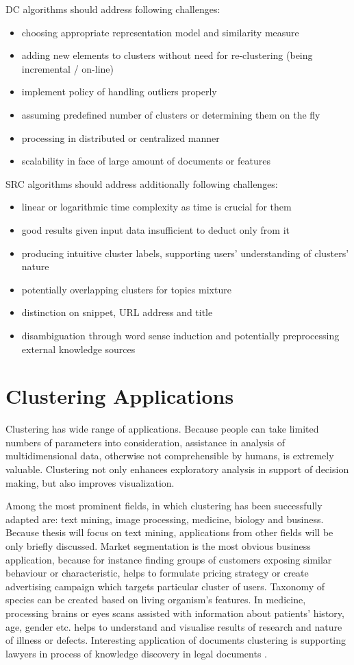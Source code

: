 \documentclass[a4paper, 12pt, oneside]{Thesis} %
\begin{document}
DC algorithms should address following challenges:
\begin{itemize}
\item choosing appropriate representation model and similarity measure
\item adding new elements to clusters without need for re-clustering (being incremental / on-line)
\item implement policy of handling outliers properly
\item assuming predefined number of clusters or determining them on the fly
\item processing in distributed or centralized manner
\item scalability in face of large amount of documents or features
\end{itemize}

SRC algorithms should address additionally following challenges:
\begin{itemize}
    \item linear or logarithmic time complexity as time is crucial for them
    \item good results given input data insufficient to deduct only from it
    \item producing intuitive cluster labels, supporting users' understanding of clusters' nature
    \item potentially overlapping clusters for topics mixture
    \item distinction on snippet, URL address and title
    \item disambiguation through word sense induction and potentially preprocessing external knowledge sources
\end{itemize}

\section{Clustering Applications} Clustering has wide range of applications. Because people can take limited numbers of parameters into consideration, assistance in analysis of multidimensional data, otherwise not comprehensible by humans, is extremely valuable. Clustering not only enhances exploratory analysis in support of decision making, but also improves visualization.

Among the most prominent fields, in which clustering has been successfully adapted are: text mining, image processing, medicine, biology and business. Because thesis will focus on text mining, applications from other fields will be only briefly discussed. Market segmentation is the most obvious business application, because for instance finding groups of customers exposing similar behaviour or characteristic, helps to formulate pricing strategy or create advertising campaign which targets particular cluster of users. Taxonomy of species can be created based on living organism's features. In medicine, processing brains or eyes scans assisted with information about patients' history, age, gender etc. helps to understand and visualise results of research and nature of illness or defects. Interesting application of documents clustering is supporting lawyers in process of knowledge discovery in legal documents \cite{kozlowski2015law}. 
\end{document}
